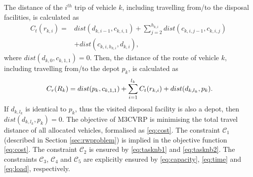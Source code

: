 \documentclass[journal]{IEEEtran}
\begin{document}
The distance of the $i^{th}$ trip of vehicle $k$, including travelling from/to the disposal facilities, is calculated as
\begin{equation}\label{eq:ct}
\begin{split}
    C_{t}(r_{k,i}) = & dist(d_{k,i-1},c_{k,i,1}) + \sum_{j=2}^{h_{k,i}} dist(c_{k,i,j-1},c_{k,i,j}) \\
    &+ dist(c_{k,i,h_{k,i}},d_{k,i}),
    \end{split}
\end{equation}
where $dist(d_{k,0},c_{k,1,1})=0$.
Then, the distance of the route of vehicle $k$, including travelling from/to the depot $p_{k}$, is calculated as 
\begin{equation}\label{eq:cr}
C_r(R_k)=dist(p_k,c_{k,1,1}) + \sum_{i=1}^{l_{k}} C_{t}(r_{k,i}) + dist(d_{k,l_k},p_k).\hspace{-3pt}
\end{equation}
If $d_{k,l_k}$ is identical to $p_k$, thus the visited disposal facility is also a depot, then $dist(d_{k,l_k},p_k)=0$. 
The objective of M3CVRP is minimising the total travel distance of all allocated vehicles, formalised as \eqref{eq:cost}. The constraint $\mathcal{C}_1$ (described in Section \ref{sec:rwproblem}) is implied in the objective function \eqref{eq:cost}. The constraint $\mathcal{C}_2$ is ensured by \eqref{eq:tasknb1} and \eqref{eq:tasknb2}. The constraints $\mathcal{C}_3$, $\mathcal{C}_4$ and $\mathcal{C}_5$ are explicitly ensured by \eqref{eq:capacity}, \eqref{eq:time} and \eqref{eq:load}, respectively.
\end{document}
